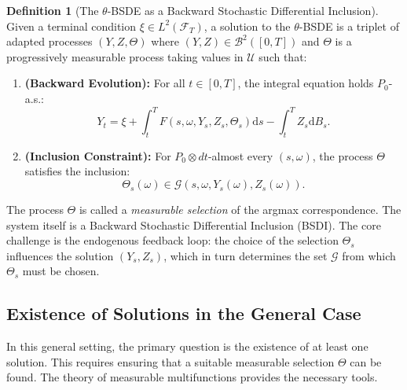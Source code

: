 \documentclass[12pt, letterpaper]{amsart}
\newcommand{\Ucal}{\mathcal{U}}
\newcommand{\Bcal}{\mathcal{B}}
\newcommand{\dd}{\mathrm{d}}
\theoremstyle{plain}
\theoremstyle{definition}
\newtheorem{definition}[theorem]{Definition}
\theoremstyle{remark}
\numberwithin{equation}{section} %
\begin{document}
\begin{definition}[The $\theta$-BSDE as a Backward Stochastic Differential Inclusion]
\label{def:bsdi}
Given a terminal condition $\xi \in L^2(\mathcal{F}_T)$, a solution to the $\theta$-BSDE is a triplet of adapted processes $(Y, Z, \Theta)$ where $(Y,Z) \in \Bcal^2([0,T])$ and $\Theta$ is a progressively measurable process taking values in $\Ucal$ such that:
\begin{enumerate}
    \item \textbf{(Backward Evolution):} For all $t \in [0,T]$, the integral equation holds $P_0$-a.s.:
    \begin{equation}
        Y_t = \xi + \int_t^T F(s, \omega, Y_s, Z_s, \Theta_s) \dd s - \int_t^T Z_s \dd B_s.
    \end{equation}
    \item \textbf{(Inclusion Constraint):} For $P_0\otimes dt$-almost every $(s,\omega)$, the process $\Theta$ satisfies the inclusion:
    \begin{equation}
        \Theta_s(\omega) \in \mathcal{G}(s, \omega, Y_s(\omega), Z_s(\omega)).
    \end{equation}
\end{enumerate}
The process $\Theta$ is called a \emph{measurable selection} of the argmax correspondence. The system itself is a Backward Stochastic Differential Inclusion (BSDI). The core challenge is the endogenous feedback loop: the choice of the selection $\Theta_s$ influences the solution $(Y_s, Z_s)$, which in turn determines the set $\mathcal{G}$ from which $\Theta_s$ must be chosen.
\end{definition}

\subsection{Existence of Solutions in the General Case}
In this general setting, the primary question is the existence of at least one solution. This requires ensuring that a suitable measurable selection $\Theta$ can be found. The theory of measurable multifunctions provides the necessary tools.
\end{document}
